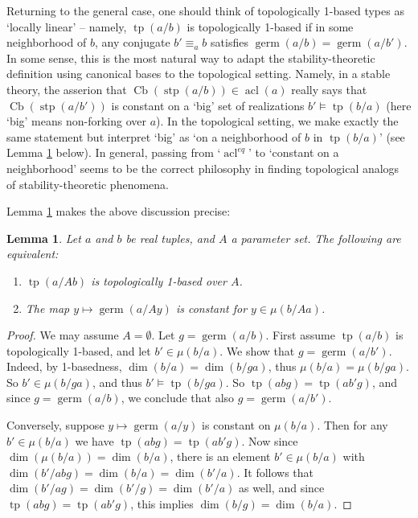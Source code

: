 \documentclass{amsart}
\newtheorem{lemma}[theorem]{Lemma}
\theoremstyle{definition}
\newcommand{\acl}{\operatorname{acl}}
\newcommand{\tp}{\operatorname{tp}}
\begin{document}
Returning to the general case, one should think of topologically 1-based types as `locally linear' -- namely, $\tp(a/b)$ is topologically 1-based if in some neighborhood of $b$, any conjugate $b'\equiv_ab$ satisfies $\operatorname{germ}(a/b)=\operatorname{germ}(a/b')$. In some sense, this is the most natural way to adapt the stability-theoretic definition using canonical bases to the topological setting. Namely, in a stable theory, the asserion that $\operatorname{Cb}(\operatorname{stp}(a/b))\in\acl(a)$ really says that $\operatorname{Cb}(\operatorname{stp}(a/b'))$ is constant on a `big' set of realizations $b'\models\tp(b/a)$ (here `big' means non-forking over $a$). In the topological setting, we make exactly the same statement but interpret `big' as `on a neighborhood of $b$ in $\tp(b/a)$' (see Lemma \ref{L: 1-based iff constant germ} below). In general, passing from `$\operatorname{acl}^{eq}$' to `constant on a neighborhood' seems to be the correct philosophy in finding topological analogs of stability-theoretic phenomena.

Lemma \ref{L: 1-based iff constant germ} makes the above discussion precise:

\begin{lemma}\label{L: 1-based iff constant germ}
    Let $a$ and $b$ be real tuples, and $A$ a parameter set. The following are equivalent:
    \begin{enumerate}
        \item $\tp(a/Ab)$ is topologically 1-based over $A$.
        \item The map $y\mapsto\operatorname{germ}(a/Ay)$ is constant for $y\in\mu(b/Aa)$.
    \end{enumerate}
\end{lemma}
\begin{proof} We may assume $A=\emptyset$.
    Let $g=\operatorname{germ}(a/b)$. First assume $\tp(a/b)$ is topologically 1-based, and let $b'\in\mu(b/a)$. We show that $g=\operatorname{germ}(a/b')$. Indeed, by 1-basedness, $\dim(b/a)=\dim(b/ga)$, thus $\mu(b/a)=\mu(b/ga)$. So $b'\in\mu(b/ga)$, and thus $b'\models\tp(b/ga)$. So $\tp(abg)=\tp(ab'g)$, and since $g=\operatorname{germ}(a/b)$, we conclude that also $g=\operatorname{germ}(a/b')$.

    Conversely, suppose $y\mapsto\operatorname{germ}(a/y)$ is constant on $\mu(b/a)$. Then for any $b'\in\mu(b/a)$ we have $\tp(abg)=\tp(ab'g)$. Now since $\dim(\mu(b/a))=\dim(b/a)$, there is an element $b'\in\mu(b/a)$ with $\dim(b'/abg)=\dim(b/a)=\dim(b'/a)$. It follows that $\dim(b'/ag)=\dim(b'/g)=\dim(b'/a)$ as well, and since $\tp(abg)=\tp(ab'g)$, this implies $\dim(b/g)=\dim(b/a)$.  
\end{proof}
\end{document}
